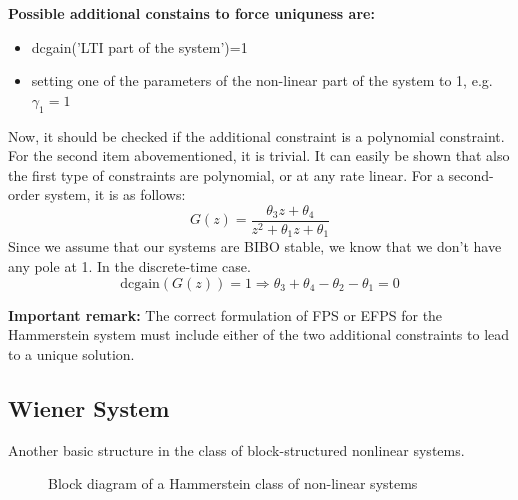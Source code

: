 \textbf{Possible additional constains to force uniquness are:}\\
\begin{itemize}
    \item dcgain('LTI part of the system')=1
    \item setting one of the parameters of the non-linear part of the system to 1, e.g.$\gamma_1 = 1$
\end{itemize}
Now, it should be checked if the additional constraint is a polynomial constraint. For the second item abovementioned, it is trivial. It can easily be shown that also the first type of constraints are polynomial, or at any rate linear. For a second-order system, it is as follows:
\[
G(z) = \frac{\theta_3z + \theta_4}{z^2 + \theta_1z + \theta_1}
\]
Since we assume that our systems are BIBO stable, we know that we don't have any pole at 1. In the discrete-time case.
\[
\text{dcgain}(G(z)) = 1 \Rightarrow \theta_3 + \theta_4 - \theta_2 - \theta_1 = 0
\]

\textbf{Important remark:} The correct formulation of FPS or EFPS for the Hammerstein system must include either of the two additional constraints to lead to a unique solution.


\subsection{Wiener System}
Another basic structure in the class of block-structured nonlinear systems.





\begin{figure}[h!]
\centering
{}
\caption{Block diagram of a Hammerstein class of non-linear systems}
\label{fig:hammerstein}
\end{figure}


